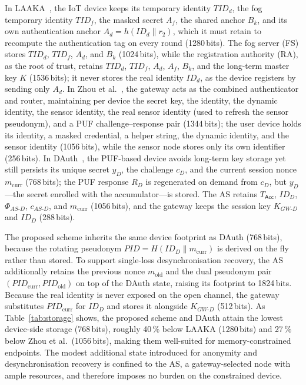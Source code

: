 In LAAKA~\cite{ali2024laaka}, the IoT device keeps its temporary identity $TID_d$,
the fog temporary identity $TID_f$, the masked secret $A_f$, the shared anchor $B_k$,
and its own authentication anchor $A_d = h(ID_d \| r_2)$, which it must retain to
recompute the authentication tag on every round (1280\,bits).
The fog server (FS) stores $TID_d$, $TID_f$, $A_d$, and $B_k$ (1024\,bits), while the
registration authority (RA), as the root of trust, retains $TID_d$, $TID_f$, $A_d$,
$A_f$, $B_k$, and the long-term master key $K$ (1536\,bits); it never stores the real
identity $ID_d$, as the device registers by sending only $A_d$.
In Zhou et al.~\cite{zhou2024auth}, the gateway acts as the combined authenticator
and router, maintaining per device the secret key, the identity, the dynamic
identity, the sensor identity, the real sensor identity (used to refresh the sensor
pseudonym), and a PUF challenge--response pair (1344\,bits); the user device holds its
identity, a masked credential, a helper string, the dynamic identity, and the sensor
identity (1056\,bits), while the sensor node stores only its own identifier
(256\,bits).
In DAuth~\cite{das2026comsnets}, the PUF-based device avoids long-term key storage yet
still persists its unique secret $y_D$, the challenge $c_D$, and the current session
nonce $m_{\mathrm{curr}}$ (768\,bits); the PUF response $R_D$ is regenerated on demand
from $c_D$, but $y_D$---the secret enrolled with the accumulator---is stored.
The AS retains $T_{\mathsf{Acc}}$, $ID_D$, $\Phi_{AS\text{-}D}$, $c_{AS\text{-}D}$, and
$m_{\mathrm{curr}}$ (1056\,bits), and the gateway keeps the session key
$K_{GW\text{-}D}$ and $ID_D$ (288\,bits).

The proposed scheme inherits the same device footprint as DAuth (768\,bits), because
the rotating pseudonym $\mathit{PID} = H(ID_D \| m_{\mathrm{curr}})$ is derived on the
fly rather than stored.
To support single-loss desynchronisation recovery, the AS additionally retains the
previous nonce $m_{\mathrm{old}}$ and the dual pseudonym pair
$(\mathit{PID}_{\mathrm{curr}}, \mathit{PID}_{\mathrm{old}})$ on top of the DAuth
state, raising its footprint to 1824\,bits.
Because the real identity is never exposed on the open channel, the gateway
substitutes $\mathit{PID}_{\mathrm{curr}}$ for $ID_D$ and stores it alongside
$K_{GW\text{-}D}$ (512\,bits).
As Table~\ref{tab:storage} shows, the proposed scheme and DAuth attain the lowest
device-side storage (768\,bits), roughly 40\,\% below LAAKA (1280\,bits) and 27\,\%
below Zhou et al.\ (1056\,bits), making them well-suited for memory-constrained
endpoints.
The modest additional state introduced for anonymity and desynchronisation recovery
is confined to the AS, a gateway-selected node with ample resources, and therefore
imposes no burden on the constrained device.

